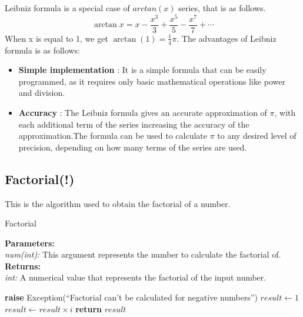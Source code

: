 \documentclass{report}
\begin{document}
  \begin{flushleft}
    Leibniz formula is a special case of $arctan(x)$ series, that is as follows.
    $$\arctan x=x-{\frac {x^{3}}{3}}+{\frac {x^{5}}{5}}-{\frac {x^{7}}{7}}+\cdots$$
    When x is equal to 1, we get $\arctan(1) = {\frac{1}{4}}\pi.$
    The advantages of Leibniz formula is as follows:
    \begin{itemize}
      \item \textbf{Simple implementation} : It is a simple formula that can be easily programmed, as it requires only basic mathematical operations like power and division.
      \item \textbf{Accuracy} : The Leibniz formula gives an accurate approximation of $\pi$, with each additional term of the series increasing the accuracy of the approximation.The formula can be used to calculate $\pi$ to any desired level of precision, depending on how many terms of the series are used.
    \end{itemize}
  \end{flushleft}
\pagebreak

\subsection{Factorial(!)}
  \begin{flushleft}
    This is the algorithm used to obtain the factorial of a number.
  \end{flushleft}
  \begin{algorithm}
    \caption{Factorial}\label{factorial}
    \begin{tabbing}
      \textbf{Parameters:}\\
        \hspace{1em}\textit{num(int):} This argument represents the number to calculate the factorial of.\\
      
      \textbf{Returns:}\\
        \hspace{1em}\textit{int:} A numerical value that represents the factorial of the input number. \\
    \end{tabbing}
  \begin{algorithmic}[1]
        \State \textbf{raise} Exception(``Factorial can't be calculated for negative numbers'')
      \EndIf
      \State $result \gets 1$
        \State $result \gets result \times i$
      \EndFor
      \State \textbf{return} $result$
    \EndFunction
    \end{algorithmic}
  \end{algorithm}
\end{document}
